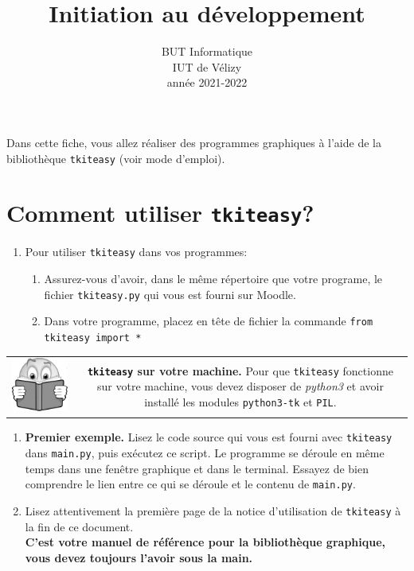 \documentclass[11pt,a4paper]{article}
\title{Initiation au développement}
\author{BUT Informatique\\
IUT de Vélizy\\
année 2021-2022}
\date{}
\newcommand{\checkbox}{$\square$ \smallskip}
\newenvironment{lecture}{%
\smallskip
\begin{tabular}{c|c}
    \hspace{.03\textwidth} \includegraphics[width=.07\textwidth]{img/lecture.jpg} & 
\begin{minipage}{.85\textwidth}
}{%
\end{minipage}
\end{tabular}
}
\newcounter{exo} \setcounter{exo}{0}
\newenvironment{action}{%
    \begin{enumerate}[\numerotation] \addtocounter{exo}{-1}%
        }{%
    \end{enumerate}
}
\newcommand{\numexoa}{\theexo \addtocounter{exo}{1}}
\newcommand{\numerotation}{\checkbox \smallskip \numexoa.}
\begin{document}





\thispagestyle{empty}
\newpage
\begin{center}
{}
\end{center}

\vskip 1cm

Dans cette fiche, vous allez réaliser des programmes graphiques à l'aide de la bibliothèque {\tt tkiteasy} (voir mode d'emploi).

\section*{Comment utiliser {\tt tkiteasy}?}

\begin{action}
\item Pour utiliser {\tt tkiteasy} dans vos programmes: 
\begin{enumerate}
  \item Assurez-vous d'avoir, dans le même répertoire que votre programe, le fichier {\tt tkiteasy.py} qui vous est fourni sur Moodle.
  \item Dans votre programme, placez en tête de fichier la commande {\tt from tkiteasy import *}
\end{enumerate}
\end{action}
    
\begin{lecture}
{\bf {\tt tkiteasy} sur votre machine.} Pour que  {\tt tkiteasy} fonctionne sur votre machine, vous devez disposer de {\it python3} et avoir installé les modules {\tt python3-tk} et {\tt PIL}.
\end{lecture}

\begin{action}
\item {\bf Premier exemple.} Lisez le code source qui vous est fourni avec  {\tt tkiteasy} dans {\tt main.py}, puis exécutez ce script. Le programme se déroule en même temps dans une fenêtre graphique et dans le terminal. Essayez de bien comprendre le lien entre ce qui se déroule et le contenu de {\tt main.py}.

\item Lisez attentivement la première page de la notice d'utilisation de {\tt tkiteasy} à la fin de ce document.\\
{\bf C'est votre manuel de référence pour la bibliothèque graphique, vous devez toujours l'avoir sous la main.}
\end{action}
\end{document}
